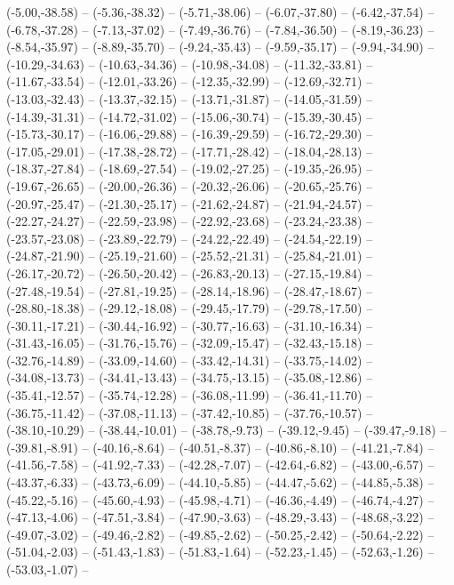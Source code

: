 {  (-5.00,-38.58) -- (-5.36,-38.32) -- (-5.71,-38.06) -- (-6.07,-37.80) -- (-6.42,-37.54) -- (-6.78,-37.28) -- (-7.13,-37.02) --
  (-7.49,-36.76) -- (-7.84,-36.50) -- (-8.19,-36.23) -- (-8.54,-35.97) -- (-8.89,-35.70) -- (-9.24,-35.43) -- (-9.59,-35.17) --
  (-9.94,-34.90) -- (-10.29,-34.63) -- (-10.63,-34.36) -- (-10.98,-34.08) -- (-11.32,-33.81) -- (-11.67,-33.54) -- (-12.01,-33.26) --
  (-12.35,-32.99) -- (-12.69,-32.71) -- (-13.03,-32.43) -- (-13.37,-32.15) -- (-13.71,-31.87) -- (-14.05,-31.59) -- (-14.39,-31.31) --
  (-14.72,-31.02) -- (-15.06,-30.74) -- (-15.39,-30.45) -- (-15.73,-30.17) -- (-16.06,-29.88) -- (-16.39,-29.59) -- (-16.72,-29.30) --
  (-17.05,-29.01) -- (-17.38,-28.72) -- (-17.71,-28.42) -- (-18.04,-28.13) -- (-18.37,-27.84) -- (-18.69,-27.54) -- (-19.02,-27.25) --
  (-19.35,-26.95) -- (-19.67,-26.65) -- (-20.00,-26.36) -- (-20.32,-26.06) -- (-20.65,-25.76) -- (-20.97,-25.47) -- (-21.30,-25.17) --
  (-21.62,-24.87) -- (-21.94,-24.57) -- (-22.27,-24.27) -- (-22.59,-23.98) -- (-22.92,-23.68) -- (-23.24,-23.38) -- (-23.57,-23.08) --
  (-23.89,-22.79) -- (-24.22,-22.49) -- (-24.54,-22.19) -- (-24.87,-21.90) -- (-25.19,-21.60) -- (-25.52,-21.31) -- (-25.84,-21.01) --
  (-26.17,-20.72) -- (-26.50,-20.42) -- (-26.83,-20.13) -- (-27.15,-19.84) -- (-27.48,-19.54) -- (-27.81,-19.25) -- (-28.14,-18.96) --
  (-28.47,-18.67) -- (-28.80,-18.38) -- (-29.12,-18.08) -- (-29.45,-17.79) -- (-29.78,-17.50) -- (-30.11,-17.21) -- (-30.44,-16.92) --
  (-30.77,-16.63) -- (-31.10,-16.34) -- (-31.43,-16.05) -- (-31.76,-15.76) -- (-32.09,-15.47) -- (-32.43,-15.18) -- (-32.76,-14.89) --
  (-33.09,-14.60) -- (-33.42,-14.31) -- (-33.75,-14.02) -- (-34.08,-13.73) -- (-34.41,-13.43) -- (-34.75,-13.15) -- (-35.08,-12.86) --
  (-35.41,-12.57) -- (-35.74,-12.28) -- (-36.08,-11.99) -- (-36.41,-11.70) -- (-36.75,-11.42) -- (-37.08,-11.13) -- (-37.42,-10.85) --
  (-37.76,-10.57) -- (-38.10,-10.29) -- (-38.44,-10.01) -- (-38.78,-9.73) -- (-39.12,-9.45) -- (-39.47,-9.18) -- (-39.81,-8.91) --
  (-40.16,-8.64) -- (-40.51,-8.37) -- (-40.86,-8.10) -- (-41.21,-7.84) -- (-41.56,-7.58) -- (-41.92,-7.33) -- (-42.28,-7.07) --
  (-42.64,-6.82) -- (-43.00,-6.57) -- (-43.37,-6.33) -- (-43.73,-6.09) -- (-44.10,-5.85) -- (-44.47,-5.62) -- (-44.85,-5.38) --
  (-45.22,-5.16) -- (-45.60,-4.93) -- (-45.98,-4.71) -- (-46.36,-4.49) -- (-46.74,-4.27) -- (-47.13,-4.06) -- (-47.51,-3.84) --
  (-47.90,-3.63) -- (-48.29,-3.43) -- (-48.68,-3.22) -- (-49.07,-3.02) -- (-49.46,-2.82) -- (-49.85,-2.62) -- (-50.25,-2.42) --
  (-50.64,-2.22) -- (-51.04,-2.03) -- (-51.43,-1.83) -- (-51.83,-1.64) -- (-52.23,-1.45) -- (-52.63,-1.26) -- (-53.03,-1.07) --
}
